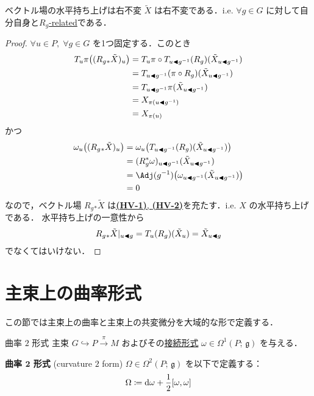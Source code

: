 \documentclass[geometry_main]{subfiles}
\begin{document}
\begin{myprop}[label=prop:horizontal-lift-vecf]{ベクトル場の水平持ち上げは右不変}
    $\tilde{X}$ は右不変である．i.e. $\forall g \in G$ に対して自分自身と\hyperref[def:F-rel]{$R_g$-related}である．
\end{myprop}

\begin{proof}
    $\forall u \in P,\; \forall g \in G$ を1つ固定する．このとき
    \begin{align}
        T_{u} \pi \bigl( (R_g{}_* \tilde{X})_{u} \bigr) 
        &= T_{u} \pi \circ T_{u \blacktriangleleft g^{-1}} (R_{g}) (\tilde{X}_{u \blacktriangleleft g^{-1}}) \\
        &= T_{u \blacktriangleleft g^{-1}} (\pi \circ R_g) (\tilde{X}_{u \blacktriangleleft g^{-1}}) \\
        &= T_{u \blacktriangleleft g^{-1}} \pi (\tilde{X}_{u \blacktriangleleft g^{-1}}) \\
        &= X_{\pi(u \blacktriangleleft g^{-1})} \\
        &= X_{\pi(u)}
    \end{align}
    かつ
    \begin{align}
        \omega_{u} \bigl( (R_g{}_* \tilde{X})_u \bigr) 
        &= \omega_{u} \bigl( T_{u \btl g^{-1}} (R_{g}) (\tilde{X}_{u \btl g^{-1}}) \bigr) \\
        &= (R_g^* \omega)_{u \btl g^{-1}} (\tilde{X}_{u \btl g^{-1}}) \\
        &= \Adj (g^{-1}) \bigl( \omega_{u \btl g^{-1}} (\tilde{X}_{u \btl g^{-1}}) \bigr)  \\
        &= 0
    \end{align}
    なので，ベクトル場 $R_g{}_* \tilde{X}$ は\hyperref[def:horizontal-lift-vecf]{\textsf{\textbf{(HV-1)}}, \textsf{\textbf{(HV-2)}}}を充たす．i.e. $X$ の水平持ち上げである．
    水平持ち上げの一意性から
    \begin{align}
        R_g{}_* \tilde{X}|_{u \blacktriangleleft g} = T_u (R_g)(\tilde{X}_u) = \tilde{X}_{u \blacktriangleleft g}
    \end{align}
    でなくてはいけない．
\end{proof}

\section{主束上の曲率形式}

この節では主束上の曲率と主束上の共変微分を大域的な形で定義する．

\begin{mydef}[label=def:curvature]{曲率 $2$ 形式}
    主束 $G \hookrightarrow P \xrightarrow{\pi} M$ およびその\hyperref[def:connection]{接続形式} $\omega \in \Omega^1(P;\, \mathfrak{g})$ を与える．
    
    \textbf{曲率 $\bm{2}$ 形式} (curvature $2$ form) $\Omega \in \Omega^2(P;\, \mathfrak{g})$ を以下で定義する：
    \begin{align}
        \Omega \coloneqq \dd{\omega} + \frac{1}{2} \comm{\omega}{\omega}
    \end{align}
\end{mydef}
\end{document}
